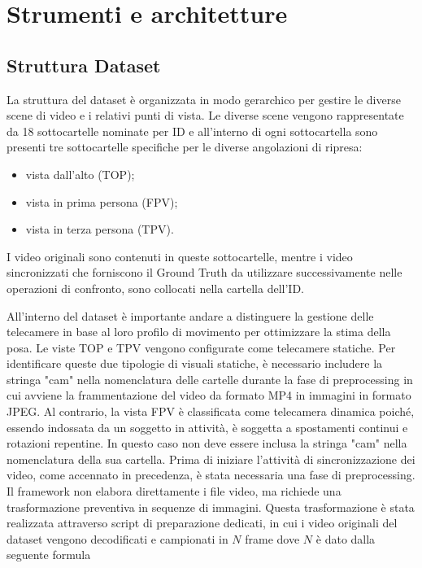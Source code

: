 \graphicspath{{chapters/chapter3/img}}
\chapter{Strumenti e architetture} \label{strumenti e architetture}
\section{Struttura Dataset}
La struttura del dataset è organizzata in modo gerarchico per gestire le diverse scene di video e i relativi punti di vista. Le diverse scene vengono rappresentate da 18 sottocartelle nominate per ID e all'interno di ogni sottocartella sono presenti tre sottocartelle specifiche per le diverse angolazioni di ripresa: 
\begin{itemize}
    \item vista dall'alto (TOP); 
    \item vista in prima persona (FPV);
    \item vista in terza persona (TPV).
\end{itemize}



I video originali sono contenuti in queste sottocartelle, mentre i video sincronizzati che forniscono il Ground Truth da utilizzare successivamente nelle operazioni di confronto, sono collocati nella cartella dell'ID.


All'interno del dataset è importante andare a distinguere la gestione delle telecamere in base al loro profilo di movimento per ottimizzare la stima della posa. Le viste TOP e TPV vengono configurate come telecamere statiche. Per identificare queste due tipologie di visuali statiche, è necessario includere la stringa "cam" nella nomenclatura delle cartelle durante la fase di preprocessing in cui avviene la frammentazione del video da formato MP4 in immagini in formato JPEG.
Al contrario, la vista FPV è classificata come telecamera dinamica poiché, essendo indossata da un soggetto in attività, è soggetta a spostamenti continui e rotazioni repentine. In questo caso non deve essere inclusa la stringa "cam" nella nomenclatura della sua cartella.
Prima di iniziare l'attività di sincronizzazione dei video, come accennato in precedenza, è stata necessaria una fase di preprocessing. Il framework non elabora direttamente i file video, ma richiede una trasformazione preventiva in sequenze di immagini. Questa trasformazione è stata realizzata attraverso script di preparazione dedicati, in cui i video originali del dataset vengono decodificati e campionati in $N$ frame dove $N$ è dato dalla seguente formula

